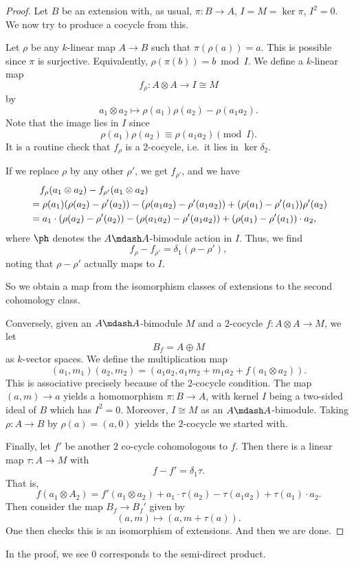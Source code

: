\documentclass[a4paper]{article}
\begin{document}
\begin{proof}
  Let $B$ be an extension with, as usual, $\pi: B \to A$, $I = M = \ker \pi$, $I^2 = 0$. We now try to produce a cocycle from this.

  Let $\rho$ be any $k$-linear map $A \to B$ such that $\pi(\rho(a)) = a$. This is possible since $\pi$ is surjective. Equivalently, $\rho(\pi(b)) = b \bmod I$. We define a $k$-linear map
  \[
    f_\rho: A \otimes A \to I \cong M
  \]
  by
  \[
    a_1 \otimes a_2 \mapsto \rho(a_1) \rho(a_2) - \rho(a_1 a_2).
  \]
  Note that the image lies in $I$ since
  \[
    \rho(a_1) \rho(a_2) \equiv \rho(a_1 a_2) \pmod I.
  \]
  It is a routine check that $f_\rho$ is a $2$-cocycle, i.e.\ it lies in $\ker \delta_2$.

  If we replace $\rho$ by any other $\rho'$, we get $f_{\rho'}$, and we have
  \begin{align*}
    &\hphantom{={}}f_\rho(a_1 \otimes a_2) - f_{\rho'} (a_1 \otimes a_2) \\
    &= \rho(a_1) (\rho(a_2) - \rho'(a_2)) - (\rho(a_1 a_2) - \rho'(a_1 a_2)) + (\rho(a_1) - \rho'(a_1))\rho'(a_2)\\
    &= a_1 \cdot (\rho(a_2) - \rho'(a_2)) - (\rho(a_1 a_2) - \rho'(a_1 a_2)) + (\rho(a_1) - \rho'(a_1)) \cdot a_2,
  \end{align*}
  where $\ph$ denotes the $A\mdash A$-bimodule action in $I$. Thus, we find
  \[
    f_\rho - f_{\rho'} = \delta_1(\rho - \rho'),
  \]
  noting that $\rho - \rho'$ actually maps to $I$.

  So we obtain a map from the isomorphism classes of extensions to the second cohomology class.

  Conversely, given an $A\mdash A$-bimodule $M$ and a $2$-cocycle $f: A \otimes A \to M$, we let
  \[
    B_f = A \oplus M
  \]
  as $k$-vector spaces. We define the multiplication map
  \[
    (a_1, m_1)(a_2, m_2) = (a_1 a_2, a_1 m_2 + m_1 a_2 + f(a_1 \otimes a_2)).
  \]
  This is associative precisely because of the 2-cocycle condition. The map $(a, m) \to a$ yields a homomorphism $\pi: B \to A$, with kernel $I$ being a two-sided ideal of $B$ which has $I^2 = 0$. Moreover, $I \cong M$ as an $A\mdash A$-bimodule. Taking $\rho: A \to B$ by $\rho(a) = (a, 0)$ yields the $2$-cocycle we started with.

  Finally, let $f'$ be another $2$ co-cycle cohomologous to $f$. Then there is a linear map $\tau: A \to M$ with
  \[
    f - f' = \delta_1 \tau.
  \]
  That is,
  \[
    f(a_1 \otimes A_2) = f'(a_1 \otimes a_2) + a_1 \cdot \tau(a_2) - \tau(a_1 a_2) + \tau(a_1) \cdot a_2.
  \]
  Then consider the map $B_f \to B_f'$ given by
  \[
    (a, m) \mapsto (a, m + \tau(a)).
  \]
  One then checks this is an isomorphism of extensions. And then we are done.
\end{proof}
In the proof, we see $0$ corresponds to the semi-direct product.
\end{document}
